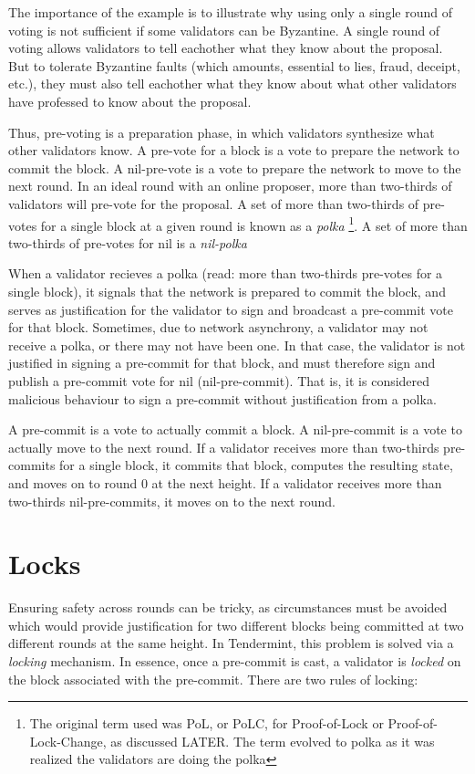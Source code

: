 The importance of the example is to illustrate why using only a single round of voting
is not sufficient if some validators can be Byzantine.
A single round of voting allows validators to tell eachother what they know about the proposal.	
But to tolerate Byzantine faults (which amounts, essential to lies, fraud, deceipt, etc.), 
they must also tell eachother what they know about what other validators have professed to know about the proposal.

Thus, pre-voting is a preparation phase, in which validators synthesize what other validators know.
A pre-vote for a block is a vote to prepare the network to commit the block.
A nil-pre-vote is a vote to prepare the network to move to the next round.
In an ideal round with an online proposer, more than two-thirds of validators will pre-vote for the proposal.
A set of more than two-thirds of pre-votes for a single block at a given round is known as a \emph{polka} \footnote{The original term used was PoL, or PoLC, for Proof-of-Lock or Proof-of-Lock-Change, as discussed LATER. The term evolved to polka as it was realized the validators are doing the polka}.
A set of more than two-thirds of pre-votes for nil is a \emph{nil-polka}

When a validator recieves a polka (read: more than two-thirds pre-votes for a single block), 
it signals that the network is prepared to commit the block,
and serves as justification for the validator to sign and broadcast a pre-commit vote for that block.
Sometimes, due to network asynchrony, a validator may not receive a polka, or there may not have been one. 
In that case, the validator is not justified in signing a pre-commit for that block, 
and must therefore sign and publish a pre-commit vote for nil (nil-pre-commit).
That is, it is considered malicious behaviour to sign a pre-commit without justification from a polka.

A pre-commit is a vote to actually commit a block.
A nil-pre-commit is a vote to actually move to the next round.
If a validator receives more than two-thirds pre-commits for a single block, 
it commits that block, computes the resulting state,
and moves on to round 0 at the next height.
If a validator receives more than two-thirds nil-pre-commits,
it moves on to the next round.

\section{Locks}

Ensuring safety across rounds can be tricky, 
as circumstances must be avoided which would provide justification for two different blocks being committed at two different rounds at the same height.
In Tendermint, this problem is solved via a \emph{locking} mechanism.
In essence, once a pre-commit is cast, a validator is \emph{locked} on the block associated with the pre-commit.
There are two rules of locking:

